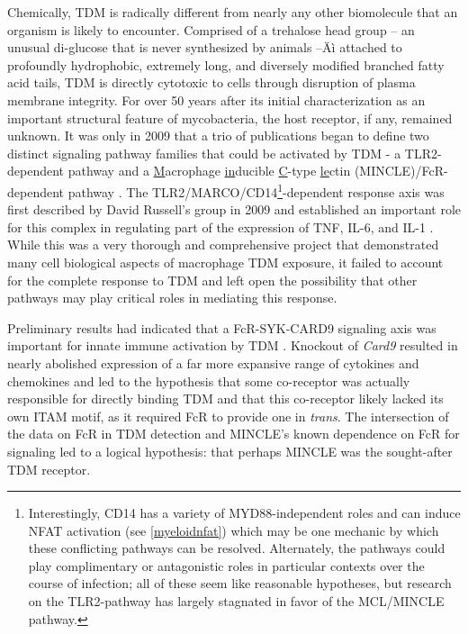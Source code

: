 Chemically, TDM is radically different from nearly any other biomolecule that an organism is likely to encounter. Comprised of a trehalose head group -- an unusual di-glucose that is never synthesized by animals \citep{Elbein2003} --Äì attached to profoundly hydrophobic, extremely long, and diversely modified branched fatty acid tails, TDM is directly cytotoxic to cells through disruption of plasma membrane integrity. For over 50 years after its initial characterization as an important structural feature of mycobacteria, the host receptor, if any, remained unknown. It was only in 2009 that a trio of publications began to define two distinct signaling pathway families that could be activated by TDM - a TLR2-dependent pathway and a \underline{M}acrophage \underline{in}ducible \underline{C}-type \underline{le}ctin (MINCLE)/Fc\textgamma R-dependent pathway \citep{Werninghaus2009, Ishikawa2009, Bowdish2009}. The TLR2/MARCO/CD14\footnote{Interestingly, CD14 has a variety of MYD88-independent roles and can induce NFAT activation (see \autoref{myeloidnfat}) which may be one mechanic by which these conflicting pathways can be resolved. Alternately, the pathways could play complimentary or antagonistic roles in particular contexts over the course of infection; all of these seem like reasonable hypotheses, but research on the TLR2-pathway has largely stagnated in favor of the MCL/MINCLE pathway.}-dependent response axis was first described by David Russell's group in 2009 and established an important role for this complex in regulating part of the expression of TNF\textalpha, IL-6, and IL-1\textbeta{} \citep{Bowdish2009}. While this was a very thorough and comprehensive project that demonstrated many cell biological aspects of macrophage TDM exposure, it failed to account for the complete response to TDM and left open the possibility that other pathways may play critical roles in mediating this response. 

Preliminary results had indicated that a Fc\textgamma R-SYK-CARD9 signaling axis was important for innate immune activation by TDM \citep{Werninghaus2009}. Knockout of \textit{Card9} resulted in nearly abolished expression of a far more expansive range of cytokines and chemokines and led to the hypothesis that some co-receptor was actually responsible for directly binding TDM and that this co-receptor likely lacked its own ITAM motif, as it required Fc\textgamma R to provide one in \textit{trans}. The intersection of the data on Fc\textgamma R in TDM detection \citep{Werninghaus2009} and MINCLE's known dependence on Fc\textgamma R for signaling \citep{Yamasaki2008} led to a logical hypothesis: that perhaps MINCLE was the sought-after TDM receptor.

